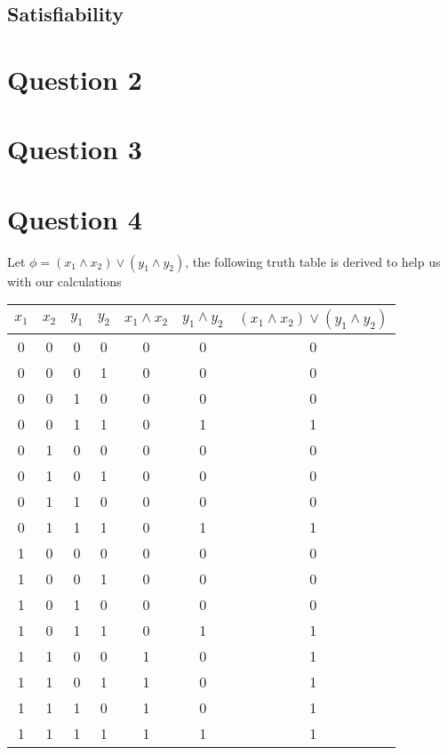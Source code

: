 \documentclass[a4paper,10pt]{article}
\begin{document}
\subsection*{Satisfiability}

\newpage
\section*{Question 2}
\newpage
\section*{Question 3}
\newpage
\section*{Question 4}
Let $\phi = (x_1 \wedge x_2) \vee (y_1 \wedge y_2) $, the following truth table is derived to help us with our calculations

\begin{center}
 
\begin{tabular}{|c|c|c|c|c|c|c|}
\hline
$x_1$ & $x_2$ & $y_1$ & $y_2$ & $x_1 \wedge x_2 $ & $y_1 \wedge y_2$ & $(x_1 \wedge x_2) \vee (y_1 \wedge y_2)$ \\
\hline
0 & 0 & 0 & 0 & 0 & 0 & 0 \\
0 & 0 & 0 & 1 & 0 & 0 & 0 \\
0 & 0 & 1 & 0 & 0 & 0 & 0 \\
0 & 0 & 1 & 1 & 0 & 1 & 1 \\
0 & 1 & 0 & 0 & 0 & 0 & 0 \\
0 & 1 & 0 & 1 & 0 & 0 & 0 \\
0 & 1 & 1 & 0 & 0 & 0 & 0 \\
0 & 1 & 1 & 1 & 0 & 1 & 1 \\
1 & 0 & 0 & 0 & 0 & 0 & 0 \\
1 & 0 & 0 & 1 & 0 & 0 & 0 \\
1 & 0 & 1 & 0 & 0 & 0 & 0 \\
1 & 0 & 1 & 1 & 0 & 1 & 1 \\
1 & 1 & 0 & 0 & 1 & 0 & 1 \\
1 & 1 & 0 & 1 & 1 & 0 & 1 \\
1 & 1 & 1 & 0 & 1 & 0 & 1 \\
1 & 1 & 1 & 1 & 1 & 1 & 1 \\

\hline
\end{tabular}

\end{center}
\end{document}
